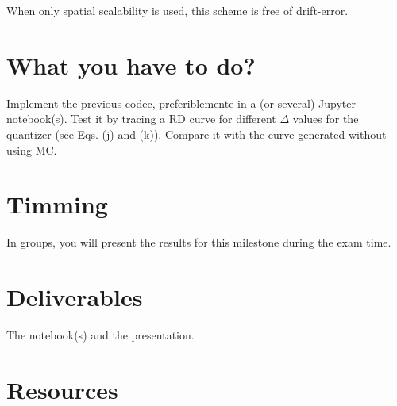 When only spatial scalability is used, this scheme is free of
drift-error.

\section{What you have to do?}

Implement the previous codec, preferiblemente in a (or several)
Jupyter notebook(s). Test it by tracing a RD curve for different
$\Delta$ values for the quantizer (see Eqs. (j) and (k)). Compare it
with the curve generated without using MC.

\section{Timming}

In groups, you will present the results for this milestone during the
exam time.

\section{Deliverables}

The notebook(s) and the presentation.

\section{Resources}


